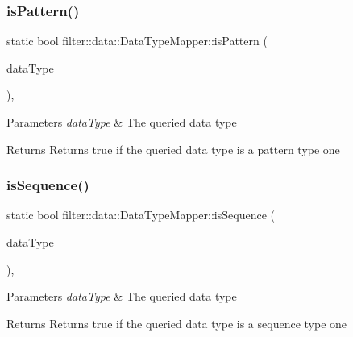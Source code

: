 \subsubsection{\texorpdfstring{is\+Pattern()}{isPattern()}}
{\footnotesize\ttfamily static bool filter\+::data\+::\+Data\+Type\+Mapper\+::is\+Pattern (\begin{DoxyParamCaption}\item[{const I\+O\+Data\+Type \&}]{data\+Type }\end{DoxyParamCaption})\hspace{0.3cm}{\ttfamily [inline]}, {\ttfamily [static]}}


\begin{DoxyParams}{Parameters}
{\em data\+Type} & The queried data type \\
\hline
\end{DoxyParams}
\begin{DoxyReturn}{Returns}
Returns true if the queried data type is a pattern type one 
\end{DoxyReturn}
\mbox{\label{classfilter_1_1data_1_1_data_type_mapper_ad4bf024b99e0a3470b8fa41523e5392c}} 
\subsubsection{\texorpdfstring{is\+Sequence()}{isSequence()}}
{\footnotesize\ttfamily static bool filter\+::data\+::\+Data\+Type\+Mapper\+::is\+Sequence (\begin{DoxyParamCaption}\item[{const I\+O\+Data\+Type \&}]{data\+Type }\end{DoxyParamCaption})\hspace{0.3cm}{\ttfamily [inline]}, {\ttfamily [static]}}


\begin{DoxyParams}{Parameters}
{\em data\+Type} & The queried data type \\
\hline
\end{DoxyParams}
\begin{DoxyReturn}{Returns}
Returns true if the queried data type is a sequence type one 
\end{DoxyReturn}
\mbox{\label{classfilter_1_1data_1_1_data_type_mapper_a5c2902ea638cf883f1955bfa1bebfc5e}} 
